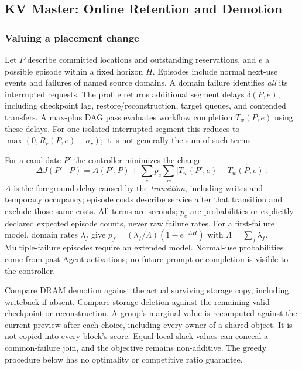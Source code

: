 \subsection{KV Master: Online Retention and Demotion}
\label{sec:kv-master}

\subsubsection{Valuing a placement change}
\label{sec:placement-value}
Let $P$ describe committed locations and outstanding reservations, and
$e$ a possible episode within a fixed horizon $H$. Episodes include
normal next-use events and failures of named source domains. A domain
failure identifies \emph{all} its interrupted requests. The profile
returns additional segment delays $\delta(P,e)$, including checkpoint lag,
restore/reconstruction, target queues, and contended transfers. A max-plus
DAG pass evaluates workflow completion $T_w(P,e)$ using these delays.
For one isolated interrupted segment this reduces to
$\max(0,R_r(P,e)-\sigma_r)$; it is not generally the sum of such terms.

For a candidate $P'$ the controller minimizes the change
\begin{equation}
 \Delta J(P'\mid P)=A(P',P)+
 \sum_e p_e\sum_w\bigl[T_w(P',e)-T_w(P,e)\bigr].
 \label{eq:value}
\end{equation}
$A$ is the foreground delay caused by the \emph{transition}, including
writes and temporary occupancy; episode costs describe service after
that transition and exclude those same costs. All terms are seconds;
$p_e$ are probabilities or explicitly declared expected episode counts,
never raw failure rates. For a first-failure model, domain rates
$\lambda_f$ give $p_f=(\lambda_f/\Lambda)(1-e^{-\Lambda H})$ with
$\Lambda=\sum_f\lambda_f$. Multiple-failure episodes require an extended
model. Normal-use probabilities come from past Agent activations;
no future prompt or completion is visible to the controller.

Compare DRAM demotion against the actual surviving storage copy, including
writeback if absent. Compare storage deletion against the remaining valid
checkpoint or reconstruction. A group's marginal value is recomputed
against the current preview after each choice, including every owner of
a shared object. It is not copied into every block's score. Equal local
slack values can conceal a common-failure join, and the objective remains
non-additive. The greedy procedure below has no optimality or competitive
ratio guarantee.

